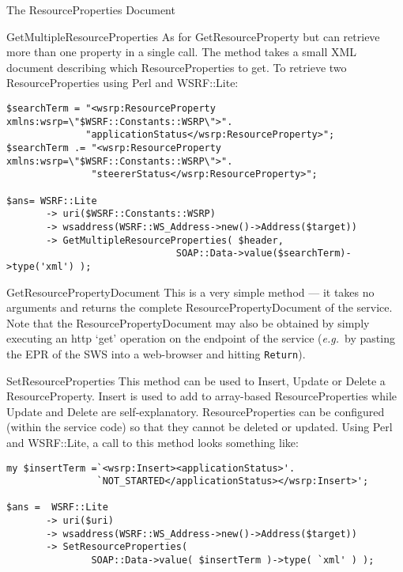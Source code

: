 \documentclass[a4paper]{article}
\begin{document}
\begin{section}{The ResourceProperties Document}
\begin{subsection}{GetMultipleResourceProperties}
As for GetResourceProperty but can retrieve more than one property in
a single call.  The method takes a small XML document describing which
ResourceProperties to get.  To retrieve two ResourceProperties using
Perl and WSRF::Lite:
\begin{verbatim}
$searchTerm = "<wsrp:ResourceProperty xmlns:wsrp=\"$WSRF::Constants::WSRP\">".
              "applicationStatus</wsrp:ResourceProperty>";
$searchTerm .= "<wsrp:ResourceProperty xmlns:wsrp=\"$WSRF::Constants::WSRP\">".
               "steererStatus</wsrp:ResourceProperty>";

$ans= WSRF::Lite
       -> uri($WSRF::Constants::WSRP)
       -> wsaddress(WSRF::WS_Address->new()->Address($target))
       -> GetMultipleResourceProperties( $header, 
                              SOAP::Data->value($searchTerm)->type('xml') );
\end{verbatim}

\end{subsection}

\begin{subsection}{GetResourcePropertyDocument}
This is a very simple method --- it takes no arguments and returns the
complete ResourcePropertyDocument of the service.  Note that the
ResourcePropertyDocument may also be obtained by simply executing an
http `get' operation on the endpoint of the service (\textit{e.g.}\ by
pasting the EPR of the SWS into a web-browser and hitting \texttt{Return}).
\end{subsection}

\begin{subsection}{SetResourceProperties}
This method can be used to Insert, Update or Delete a
ResourceProperty.  Insert is used to add to array-based
ResourceProperties while Update and Delete are self-explanatory.
ResourceProperties can be configured (within the service code) so that
they cannot be deleted or updated.  Using Perl and WSRF::Lite, a call
to this method looks something like:
\begin{verbatim}
my $insertTerm =`<wsrp:Insert><applicationStatus>'.
                `NOT_STARTED</applicationStatus></wsrp:Insert>';

$ans =  WSRF::Lite
       -> uri($uri)
       -> wsaddress(WSRF::WS_Address->new()->Address($target))  
       -> SetResourceProperties( 
               SOAP::Data->value( $insertTerm )->type( `xml' ) );
\end{verbatim}
\end{subsection}

\end{section}
\end{document}
